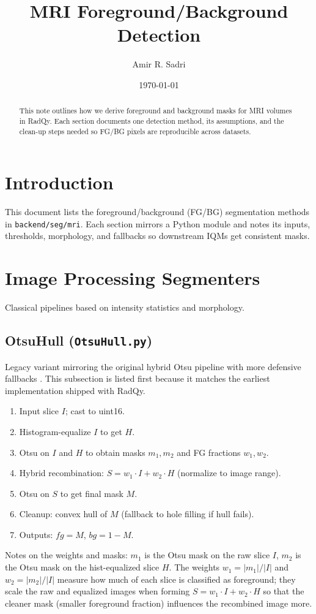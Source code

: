 \documentclass[11pt]{AmirGitDoc}
\title{MRI Foreground/Background Detection}
\author{Amir R. Sadri}
\date{\today}
\begin{document}
\maketitle
\thispagestyle{fancy}

\begin{abstract}
This note outlines how we derive foreground and background masks for MRI volumes in RadQy. Each section documents one detection method, its assumptions, and the clean-up steps needed so FG/BG pixels are reproducible across datasets.
\end{abstract}
\AmirGitDocToc
\clearpage

\section{Introduction}
This document lists the foreground/background (FG/BG) segmentation methods in \texttt{backend/seg/}\allowbreak\texttt{mri}. Each section mirrors a Python module and notes its inputs, thresholds, morphology, and fallbacks so downstream IQMs get consistent masks.

\section{Image Processing Segmenters}
Classical pipelines based on intensity statistics and morphology.

\subsection{OtsuHull \texorpdfstring{(\texttt{OtsuHull.py})}{ (HybridOtsuLegacySeg.py)}}
Legacy variant mirroring the original hybrid Otsu pipeline with more defensive fallbacks \cite{sadri2020mrqy}. This subsection is listed first because it matches the earliest implementation shipped with RadQy.
\begin{AmirAlgo}
\begin{enumerate}
    \item Input slice $I$; cast to uint16.
    \item Histogram-equalize $I$ to get $H$.
    \item Otsu on $I$ and $H$ to obtain masks $m_1, m_2$ and FG fractions $w_1, w_2$.
    \item Hybrid recombination: $S = w_1 \cdot I + w_2 \cdot H$ (normalize to image range).
    \item Otsu on $S$ to get final mask $M$.
    \item Cleanup: convex hull of $M$ (fallback to hole filling if hull fails).
    \item Outputs: $fg = M$, $bg = 1 - M$.
\end{enumerate}
\end{AmirAlgo}
Notes on the weights and masks: $m_1$ is the Otsu mask on the raw slice $I$, $m_2$ is the Otsu mask on the hist-equalized slice $H$. The weights $w_1 = |m_1| / |I|$ and $w_2 = |m_2| / |I|$ measure how much of each slice is classified as foreground; they scale the raw and equalized images when forming $S = w_1 \cdot I + w_2 \cdot H$ so that the cleaner mask (smaller foreground fraction) influences the recombined image more.
\end{document}
